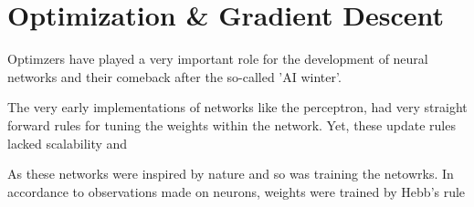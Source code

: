 \setchapterpreamble[u]{\margintoc}
\chapter{Optimization \& Gradient Descent}

Optimzers have played a very important role for the development of neural networks and their comeback after the so-called 'AI winter'.

The very early implementations of networks like the perceptron, had very straight forward rules for tuning the weights within the network.
Yet, these update rules lacked scalability and 

As these networks were inspired by nature and so was training the netowrks.
In accordance to observations made on neurons, weights were trained by Hebb's rule \cite{Hebb}

